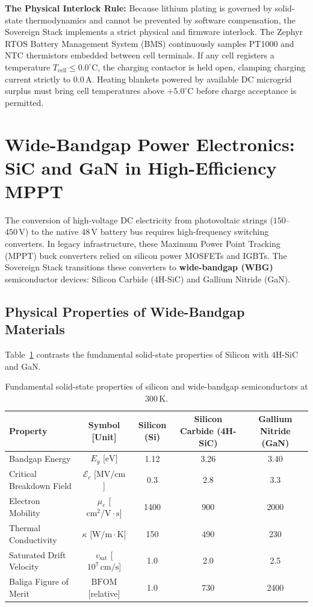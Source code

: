 \textbf{The Physical Interlock Rule:} Because lithium plating is governed by solid-state thermodynamics and cannot be prevented by software compensation, the Sovereign Stack implements a strict physical and firmware interlock. The Zephyr RTOS Battery Management System (BMS) continuously samples PT1000 and NTC thermistors embedded between cell terminals. If any cell registers a temperature $T_{\mathrm{cell}} \le 0.0^\circ\mathrm{C}$, the charging contactor is held open, clamping charging current strictly to $0.0\,\mathrm{A}$. Heating blankets powered by available DC microgrid surplus must bring cell temperatures above $+5.0^\circ\mathrm{C}$ before charge acceptance is permitted.

\section{Wide-Bandgap Power Electronics: SiC and GaN in High-Efficiency MPPT}

The conversion of high-voltage DC electricity from photovoltaic strings ($150$--$450\,\mathrm{V}$) to the native $48\,\mathrm{V}$ battery bus requires high-frequency switching converters. In legacy infrastructure, these Maximum Power Point Tracking (MPPT) buck converters relied on silicon power MOSFETs and IGBTs. The Sovereign Stack transitions these converters to \textbf{wide-bandgap (WBG)} semiconductor devices: Silicon Carbide ($4\mathrm{H}$-SiC) and Gallium Nitride (GaN).

\subsection{Physical Properties of Wide-Bandgap Materials}

Table~\ref{tab:wbg-properties} contrasts the fundamental solid-state properties of Silicon with $4\mathrm{H}$-SiC and GaN.

\begin{table}[htbp]
\centering
\small
\begin{tabular}{|l|c|c|c|c|}
\hline
\textbf{Property} & \textbf{Symbol [Unit]} & \textbf{Silicon (Si)} & \textbf{Silicon Carbide (4H-SiC)} & \textbf{Gallium Nitride (GaN)} \\
\hline
Bandgap Energy & $E_g$ [$\mathrm{eV}$] & 1.12 & 3.26 & 3.40 \\
Critical Breakdown Field & $\mathcal{E}_c$ [$\mathrm{MV/cm}$] & 0.3 & 2.8 & 3.3 \\
Electron Mobility & $\mu_e$ [$\mathrm{cm^2/V\cdot s}$] & 1400 & 900 & 2000 \\
Thermal Conductivity & $\kappa$ [$\mathrm{W/m\cdot K}$] & 150 & 490 & 230 \\
Saturated Drift Velocity & $v_{\mathrm{sat}}$ [$10^7\,\mathrm{cm/s}$] & 1.0 & 2.0 & 2.5 \\
Baliga Figure of Merit & $\mathrm{BFOM}$ [relative] & 1.0 & 730 & 2400 \\
\hline
\end{tabular}
\caption{Fundamental solid-state properties of silicon and wide-bandgap semiconductors at $300\,\mathrm{K}$.}
\label{tab:wbg-properties}
\end{table}

